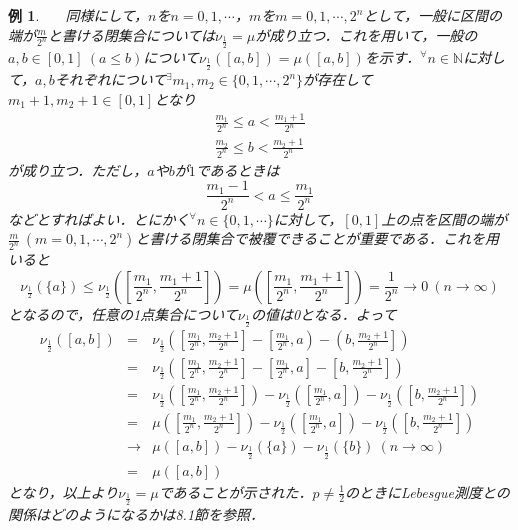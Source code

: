\documentclass[a4paper,11pt]{jsarticle}
\newtheorem{instance}[definition]{例}%
\begin{document}
\begin{instance}
{\ }{\ }{\ }同様にして，$n$を$n=0,1,\cdots$，$m$を$m=0,1,\cdots,2^n$として，一般に区間の端が$\displaystyle \frac{m}{2^n}$と書ける閉集合については$\nu_{\frac{1}{2}}=\mu$が成り立つ．これを用いて，一般の$a,b\in [0,1]{\ }(a\leq b)$について$\nu_{\frac{1}{2}}([a,b])=\mu([a,b])$を示す．$^\forall n\in\mathbb{N}$に対して，$a,b$それぞれについて$^\exists m_1,m_2\in \{0,1,\cdots,2^n\}$が存在して$m_1+1,m_2+1\in [0,1]$となり
\begin{eqnarray*}
\frac{m_1}{2^n}\leq a<\frac{m_1+1}{2^n} \\
\frac{m_2}{2^n}\leq b<\frac{m_2+1}{2^n}
\end{eqnarray*}
が成り立つ．ただし，$a$や$b$が$1$であるときは
\begin{equation*}
\frac{m_1-1}{2^n}<a\leq\frac{m_1}{2^n}
\end{equation*}
などとすればよい．とにかく$^\forall n\in\{0,1,\cdots\}$に対して，$[0,1]$上の点を区間の端が$\frac{m}{2^n}{\ }(m=0,1,\cdots,2^n)$と書ける閉集合で被覆できることが重要である．これを用いると
\begin{equation*}
\nu_{\frac{1}{2}}(\{a\})\leq\nu_{\frac{1}{2}}\left(\left[\frac{m_1}{2^n},\frac{m_1+1}{2^n}\right]\right)=\mu\left(\left[\frac{m_1}{2^n},\frac{m_1+1}{2^n}\right]\right)=\frac{1}{2^n}\to 0{\ }(n\to\infty)
\end{equation*}
となるので，任意の1点集合について$\nu_{\frac{1}{2}}$の値は0となる．よって
\begin{eqnarray*}
\nu_{\frac{1}{2}}([a,b])&=&\nu_{\frac{1}{2}}\left(\left[\frac{m_1}{2^n},\frac{m_2+1}{2^n}\right]-\left[\frac{m_1}{2^n},a\right)-\left(b,\frac{m_2+1}{2^n}\right]\right) \\
&=&\nu_{\frac{1}{2}}\left(\left[\frac{m_1}{2^n},\frac{m_2+1}{2^n}\right]-\left[\frac{m_1}{2^n},a\right]-\left[b,\frac{m_2+1}{2^n}\right]\right) \\
&=&\nu_{\frac{1}{2}}\left(\left[\frac{m_1}{2^n},\frac{m_2+1}{2^n}\right]\right)-\nu_{\frac{1}{2}}\left(\left[\frac{m_1}{2^n},a\right]\right)-\nu_{\frac{1}{2}}\left(\left[b,\frac{m_2+1}{2^n}\right]\right) \\
&=&\mu\left(\left[\frac{m_1}{2^n},\frac{m_2+1}{2^n}\right]\right)-\nu_{\frac{1}{2}}\left(\left[\frac{m_1}{2^n},a\right]\right)-\nu_{\frac{1}{2}}\left(\left[b,\frac{m_2+1}{2^n}\right]\right) \\
&\to&\mu([a,b])-\nu_{\frac{1}{2}}(\{a\})-\nu_{\frac{1}{2}}(\{b\}){\ }(n\to\infty) \\
&=&\mu([a,b])
\end{eqnarray*}
となり，以上より$\nu_{\frac{1}{2}}=\mu$であることが示された．$\displaystyle p\neq \frac{1}{2}$のときにLebesgue測度との関係はどのようになるかは8.1節を参照．
\end{instance}
%
%
%
%
\end{document}
